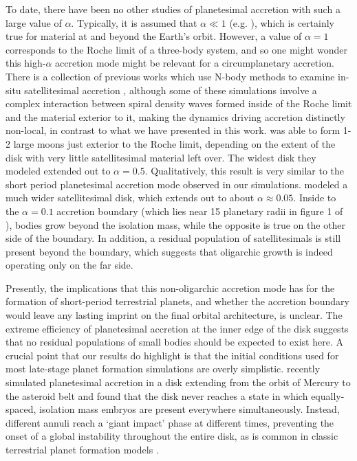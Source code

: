 To date, there have been no other studies of planetesimal accretion
with such a large value of $\alpha$. Typically, it is assumed that $\alpha \ll 1$ (e.g. \cite{lithwick14}), which is certainly true for material at and beyond the Earth's orbit. However, a value of $\alpha = 1$
corresponds to the Roche limit of a three-body system, and so one
might wonder this high-$\alpha$ accretion mode might be relevant for a
circumplanetary accretion. There is a collection of previous works
which use N-body methods to examine in-situ satellitesimal accretion
\cite{ida97, richardson00, kokubo00b, ida20}, although some of these simulations involve a complex interaction between spiral 
density waves formed inside of the Roche limit and the material exterior to it, making the dynamics driving accretion distinctly non-local, in contrast to what we have presented in this work. \cite{ida97} was able to form 1-2
large moons just exterior to the Roche limit, depending on the extent of the disk with very little satellitesimal material left over. 
The widest disk they modeled extended out to $\alpha = 0.5$. Qualitatively, this result is very similar to the short period 
planetesimal accretion mode observed in our simulations. \cite{ida20} modeled a much wider satellitesimal disk, which extends 
out to about $\alpha \approx 0.05$. Inside to the $\alpha = 0.1$ accretion boundary (which lies near 15 planetary radii in figure 1 of 
\cite{ida20}), bodies grow beyond the isolation mass, while the opposite is true on the other side of the boundary. In addition, a 
residual population of satellitesimals is still present beyond the boundary, which suggests that oligarchic growth is indeed 
operating only on the far side.

Presently, the implications that this non-oligarchic accretion mode has for the formation of short-period terrestrial planets, and 
whether the accretion boundary would leave any lasting imprint on the final orbital architecture, is unclear. The extreme efficiency of planetesimal accretion at the inner edge of the disk suggests that no residual populations of small bodies should be expected to exist here. A crucial point that our 
results do highlight is that the initial conditions used for most late-stage planet formation simulations are overly simplistic. 
\cite{clement20} recently simulated planetesimal accretion in a disk extending from the orbit of Mercury to the asteroid belt and 
found that the disk never reaches a state in which equally-spaced, isolation mass embryos are present everywhere 
simultaneously. Instead, different annuli reach a `giant impact' phase at different times, preventing the onset of a global instability 
throughout the entire disk, as is common in classic terrestrial planet formation models \cite{chambers01, raymond09}.

